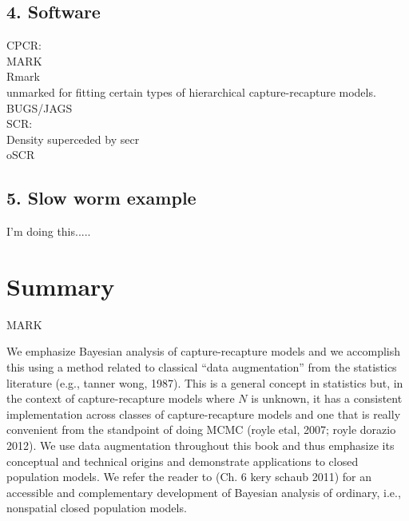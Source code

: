 \documentclass{book}
\begin{document}
\subsection*{4. Software}

CPCR:\\
  MARK\\
  Rmark\\
  unmarked for fitting certain types of hierarchical capture-recapture models.\\
  BUGS/JAGS\\
SCR:\\
  Density superceded by secr\\
  oSCR\\

\subsection*{5. Slow worm example}

I'm doing this.....

\section{Summary}


MARK


We emphasize Bayesian analysis of capture-recapture models and we
accomplish this using a method related to classical ``data
augmentation'' from the statistics literature (e.g., tanner wong, 1987).  This is a general concept in
statistics but, in the context of capture-recapture models where $N$
is unknown, it has a consistent implementation across classes of
capture-recapture models and one that is really convenient from the
standpoint of doing MCMC
(royle etal, 2007; royle dorazio 2012). We use data augmentation
throughout this book and thus emphasize its conceptual and technical
origins and demonstrate applications to closed population models.  We
refer the reader to (Ch. 6 kery schaub 2011) for an
accessible and complementary development of Bayesian analysis of
ordinary, i.e., nonspatial closed population models.
\end{document}
